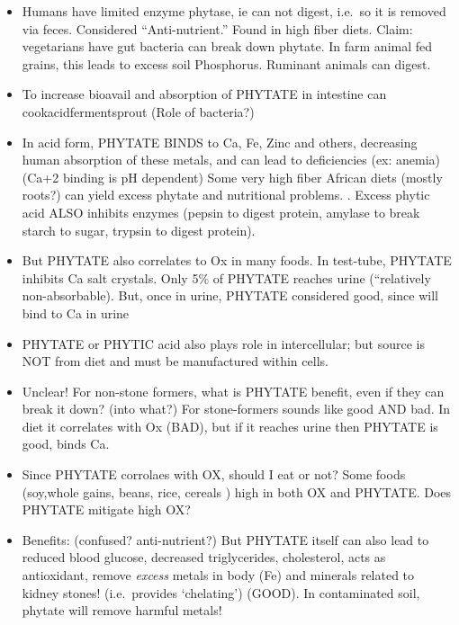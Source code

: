 \begin{itemize}
\tightlist
\item
  Humans have limited enzyme phytase, ie can not digest, i.e.~so it is
  removed via feces. Considered ``Anti-nutrient.'' Found in high fiber
  diets. Claim: vegetarians have gut bacteria can break down phytate. In
  farm animal fed grains, this leads to excess soil Phosphorus. Ruminant
  animals can digest.\\
\item
  To increase bioavail and absorption of PHYTATE in intestine can
  cook\textbar acid\textbar ferment\textbar sprout (Role of bacteria?)
\item
  In acid form, PHYTATE BINDS to Ca, Fe, Zinc and others, decreasing
  human absorption of these metals, and can lead to deficiencies (ex:
  anemia) (Ca+2 binding is pH dependent) Some very high fiber African
  diets (mostly roots?) can yield excess phytate and nutritional
  problems. . Excess phytic acid ALSO inhibits enzymes (pepsin to digest
  protein, amylase to break starch to sugar, trypsin to digest protein).
\item
  But PHYTATE also correlates to Ox in many foods. In test-tube, PHYTATE
  inhibits Ca salt crystals. Only 5\% of PHYTATE reaches urine
  (``relatively non-absorbable). But, once in urine, PHYTATE considered
  good, since will bind to Ca in urine\\
\item
  PHYTATE or PHYTIC acid also plays role in intercellular; but source is
  NOT from diet and must be manufactured within cells.
\item
  Unclear! For non-stone formers, what is PHYTATE benefit, even if they
  can break it down? (into what?) For stone-formers sounds like good AND
  bad. In diet it correlates with Ox (BAD), but if it reaches urine then
  PHYTATE is good, binds Ca.
\item
  Since PHYTATE corrolaes with OX, should I eat or not? Some foods
  (soy,whole gains, beans, rice, cereals ) high in both OX and PHYTATE.
  Does PHYTATE mitigate high OX?
\item
  Benefits: (confused? anti-nutrient?) But PHYTATE itself can also lead
  to reduced blood glucose, decreased triglycerides, cholesterol, acts
  as antioxidant, remove \emph{excess} metals in body (Fe) and minerals
  related to kidney stones! (i.e.~provides `chelating') (GOOD). In
  contaminated soil, phytate will remove harmful metals!
\end{itemize}

